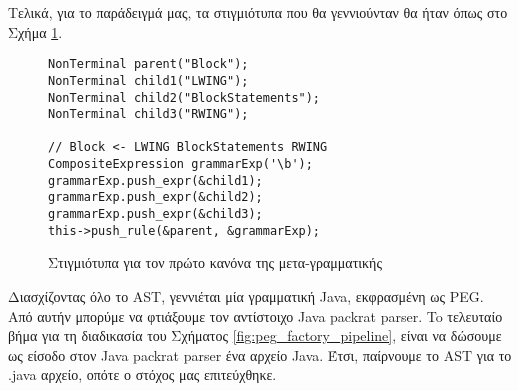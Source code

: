 Τελικά, για το παράδειγμά μας, τα στιγμιότυπα που θα γεννιούνταν θα ήταν όπως στο Σχήμα \ref{fig:objects_seq_example}. 

\begin{figure}[h]
\setlength\partopsep{-\topsep}%
\begin{verbatim}
NonTerminal parent("Block");
NonTerminal child1("LWING");
NonTerminal child2("BlockStatements");
NonTerminal child3("RWING");

// Block <- LWING BlockStatements RWING
CompositeExpression grammarExp('\b');
grammarExp.push_expr(&child1);
grammarExp.push_expr(&child2);
grammarExp.push_expr(&child3);
this->push_rule(&parent, &grammarExp);
\end{verbatim}
\caption{Στιγμιότυπα για τον πρώτο κανόνα της μετα-γραμματικής}
\label{fig:objects_seq_example}
\end{figure}

Διασχίζοντας όλο το AST, γεννιέται μία γραμματική Java, εκφρασμένη ως PEG.
Από αυτήν μπορύμε να φτιάξουμε τον αντίστοιχο Java packrat parser.
To τελευταίο βήμα για  τη διαδικασία του Σχήματος \ref{fig:peg_factory_pipeline}, είναι να δώσουμε ως είσοδο στον Java packrat parser ένα αρχείο Java.
Έτσι, παίρνουμε το AST για το .java αρχείο, οπότε ο στόχος μας επιτεύχθηκε.

